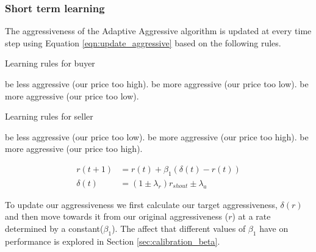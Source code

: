 \documentclass[preprint]{acm_proc_article-sp} %
\begin{document}
\subsubsection{Short term learning} \label{sec:AA_short_term_learning}
The aggressiveness of the Adaptive Aggressive algorithm is updated at every
time step using Equation \ref{eqn:update_aggressive} based on the following rules.

\begin{algorithm}[H]
  \caption{Learning rules for buyer}
  \begin{algorithmic}
            \STATE be less aggressive (our price too high).
        \ELSE
            \STATE be more aggressive (our price too low).
        \ENDIF
        \STATE be more aggressive (our price too low).
    \ENDIF
  \end{algorithmic}
  \label{alg:learning_rules_buyer}
\end{algorithm}

\begin{algorithm}[H]
  \caption{Learning rules for seller}
  \begin{algorithmic}
            \STATE be less aggressive (our price too low).
        \ELSE
            \STATE be more aggressive (our price too high).
        \ENDIF
        \STATE be more aggressive (our price too high).
    \ENDIF
  \end{algorithmic}
  \label{alg:learning_rules_seller}
\end{algorithm}

\begin{equation}
  \begin{aligned}
    r(t+1) &= r(t) + \beta_1(\delta(t) - r(t))\\
    \delta(t) &= (1 \pm \lambda_r)r_{shout} \pm \lambda_a
  \end{aligned}
  \label{eqn:update_aggressive}
\end{equation}

To update our aggressiveness we first calculate our target aggressiveness,
$\delta(r)$ and then move towards it from our original aggressiveness ($r$) at
a rate determined by a constant($\beta_1$). The affect that different values of
$\beta_1$ have on performance is explored in Section \ref{sec:calibration_beta}.
\end{document}

